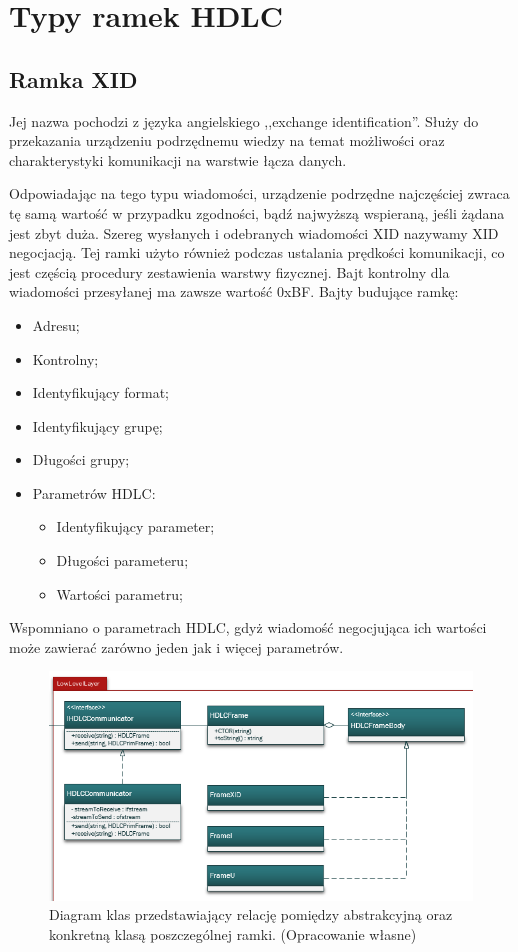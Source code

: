 \section{Typy ramek HDLC}
	\subsection{Ramka XID}
	Jej nazwa pochodzi z języka angielskiego ,,exchange identification''. 
	Służy do przekazania urządzeniu podrzędnemu wiedzy na temat możliwości oraz charakterystyki komunikacji na warstwie łącza danych.
	
	Odpowiadając na tego typu wiadomości, urządzenie podrzędne najczęściej zwraca tę samą wartość w przypadku zgodności, 
	bądź najwyższą wspieraną, jeśli żądana jest zbyt duża. Szereg wysłanych i odebranych wiadomości XID nazywamy XID negocjacją.
	Tej ramki użyto również podczas ustalania prędkości komunikacji, co jest częścią procedury zestawienia warstwy fizycznej.
	Bajt kontrolny dla wiadomości przesyłanej ma zawsze wartość 0xBF. \newline
	Bajty budujące ramkę:
	\begin{itemize}
		\item Adresu;
		\item Kontrolny;
		\item Identyfikujący format;
		\item Identyfikujący grupę;
		\item Długości grupy;
		\item Parametrów HDLC:
		\begin{itemize}
			\item Identyfikujący parameter;
			\item Długości parameteru;
			\item Wartości parametru;
		\end{itemize}
	\end{itemize} 
	Wspomniano o parametrach HDLC, gdyż wiadomość negocjująca ich wartości może zawierać zarówno jeden jak i więcej parametrów.

	\begin{figure}[h!]
         \centering
         \includegraphics[scale=0.75]{Obrazki/DiagramyKlas/LowLevel.png}
         \caption{Diagram klas przedstawiający relację pomiędzy abstrakcyjną oraz konkretną klasą poszczególnej ramki.
             \newline(Opracowanie własne)}
    \end{figure}